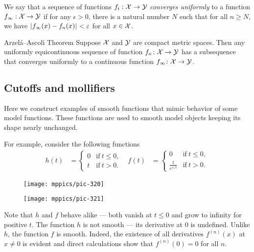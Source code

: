 We say that a sequence of functions $f_i : {\mathcal{X}} \to \mathcal{Y}$ \emph{converges uniformly} to a function $f_{\infty}: {\mathcal{X}} \to \mathcal{Y}$ if for any 
$\epsilon >0$, there is a natural number $N$ such that for all $n \ge N$, we have $\dist{f_{\infty}(x)}{f_n (x)}{}<\epsilon$
for all $x  \in {\mathcal{X}}$.

\begin{thm}{Arzel\'{a}--Ascoli Theorem}\label{lem:equicontinuous}
Suppose $\mathcal{X}$ and $\mathcal{Y}$ are compact metric spaces. 
Then any uniformly equicontinuous sequence of function $f_n\:\spc{X}\z\to \spc{Y}$ has a subsequence that converges uniformly to a continuous function $f_\infty\colon\mathcal{X}\to \mathcal{Y}$. 
\end{thm}

\subsection*{Cutoffs and mollifiers}

Here we construct examples of smooth functions that mimic behavior of some model functions.
These functions are used to smooth model objects keeping its shape nearly unchanged.

For example, consider the following functions
\begin{align*}
h(t)&=
\begin{cases}
0&\text{if}\ t\le 0,
\\
t&\text{if}\ t> 0.
\end{cases}
&
f(t)&=
\begin{cases}
0&\text{if}\ t\le 0,
\\
\frac{t}{e^{1\!/\!t}}&\text{if}\ t> 0.
\end{cases}
\end{align*}
\begin{figure}[h]
\begin{minipage}{.48\textwidth}
\centering
\texttt{[image: mppics/pic-320]}
\end{minipage}\hfill
\begin{minipage}{.48\textwidth}
\centering
\texttt{[image: mppics/pic-321]}
\end{minipage}
\end{figure}
Note that $h$ and $f$ behave alike ---
both vanish at $t\le 0$ and grow to infinity for positive $t$.
The function $h$ is not smooth --- its derivative at $0$ is undefined.
Unlike $h$, the function $f$ is smooth.
Indeed, the existence of all derivatives $f^{(n)}(x)$ at $x\ne 0$ is evident and direct calculations show that $f^{(n)}(0)=0$ for all $n$.

